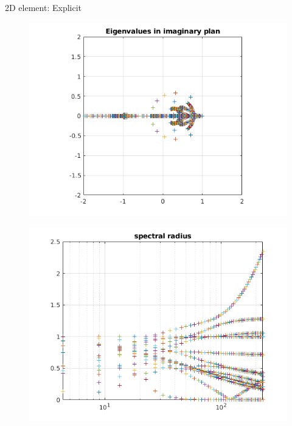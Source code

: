 \begin{frame}{2D element: Explicit}
\begin{figure}[ht] 
  \label{ fig7} 
  \begin{minipage}[b]{0.5\linewidth}
    \centering
    \includegraphics[scale=.4]{images/2Dpml-exp-1.png} \\

  \end{minipage}%
  \begin{minipage}[b]{0.5\linewidth}
    \centering
    \includegraphics[scale=.4]{images/2Dpml-exp-2.png} \\
  \end{minipage} 

\end{figure}
\end{frame}